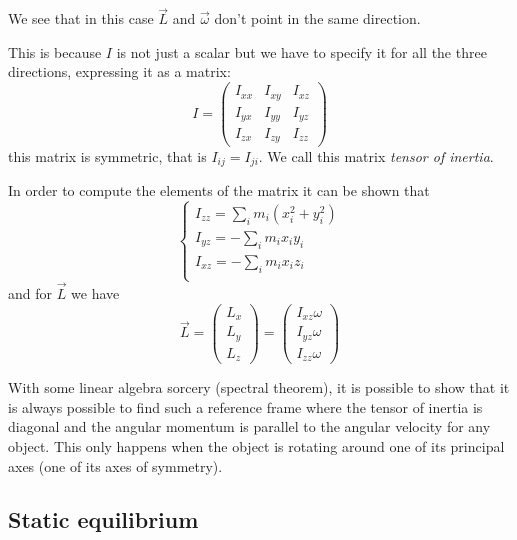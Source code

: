\documentclass[12pt]{extarticle}
\begin{document}
We see that in this case $\vec{L}$ and $\vec{\omega}$ don't point in the same direction.

This is because $I$ is not just a scalar but we have to specify it for all the three directions, expressing it as a matrix:
\begin{equation}
    I = \begin{pmatrix}
        I_{xx} & I_{xy} & I_{xz} \\
        I_{yx} & I_{yy} & I_{yz} \\
        I_{zx} & I_{zy} & I_{zz}
    \end{pmatrix}
\end{equation}
this matrix is symmetric, that is $I_{ij} = I_{ji}$. We call this matrix \emph{tensor of inertia}.

In order to compute the elements of the matrix it can be shown that
\begin{equation}
    \begin{cases}
        I_{zz} = \sum_i m_i (x_i^2 + y_i^2) \\
        I_{yz} = - \sum_i m_i x_i y_i       \\
        I_{xz} = - \sum_i m_i x_i z_i       \\
    \end{cases}
\end{equation}
and for $\vec{L}$ we have
\begin{equation}
    \vec{L} = \begin{pmatrix}
        L_x \\
        L_y \\
        L_z
    \end{pmatrix}
    =
    \begin{pmatrix}
        I_{xz} \omega \\
        I_{yz} \omega \\
        I_{zz} \omega
    \end{pmatrix}
\end{equation}

With some linear algebra sorcery (spectral theorem), it is possible to show that it is always possible to find such a reference frame where the tensor of inertia is diagonal and the angular momentum is parallel to the angular velocity for any object.
This only happens when the object is rotating around one of its principal axes (one of its axes of symmetry).


\subsection{Static equilibrium}
\end{document}

